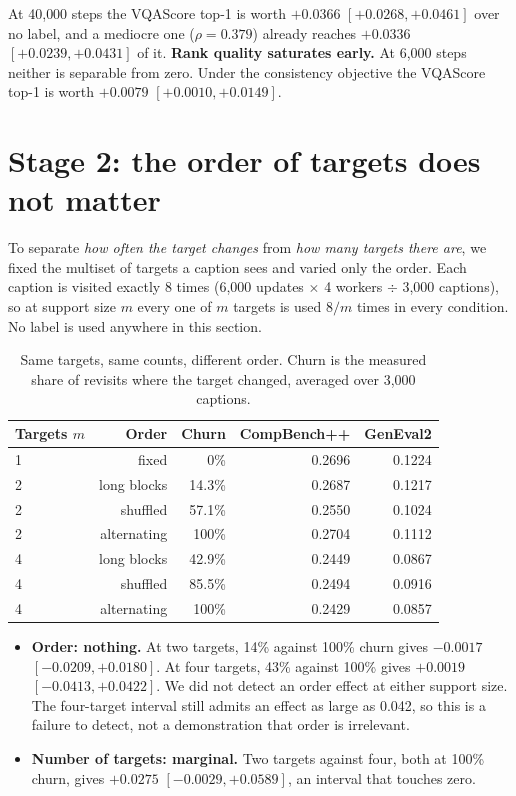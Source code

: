 \documentclass[11pt]{article}
\newcommand{\obs}[1]{\textcolor{obsblue}{#1}}
\newcommand{\bad}[1]{\textcolor{badred}{#1}}
\begin{document}
At \obs{40{,}000} steps the VQAScore top-1 is worth \obs{$+0.0366$} $[+0.0268,+0.0461]$ over no label,
and a mediocre one (\obs{$\rho=0.379$}) already reaches \obs{$+0.0336$} $[+0.0239,+0.0431]$ of it.
\textbf{Rank quality saturates early.} At \obs{6{,}000} steps neither is separable from zero. Under
the consistency objective the VQAScore top-1 is worth \obs{$+0.0079$} $[+0.0010,+0.0149]$.


\section{Stage 2: the order of targets does not matter}
\label{sec:stage2}

To separate \emph{how often the target changes} from \emph{how many targets there are}, we fixed the
multiset of targets a caption sees and varied only the order. Each caption is visited exactly
\obs{8} times (\obs{6{,}000} updates $\times$ \obs{4} workers $\div$ \obs{3{,}000} captions), so at
support size $m$ every one of $m$ targets is used $8/m$ times in every condition. No label is used
anywhere in this section.

\begin{table}[h]
\centering
\caption{Same targets, same counts, different order. Churn is the measured share of revisits where
the target changed, averaged over \obs{3{,}000} captions.}
\label{tab:order}
\small
\begin{tabular}{@{}lrrrr@{}}
\toprule
Targets $m$ & Order & Churn & CompBench++ & GenEval2 \\
\midrule
1 & fixed        & \obs{0\%}     & \obs{0.2696} & \obs{0.1224} \\
2 & long blocks  & \obs{14.3\%}  & \obs{0.2687} & \obs{0.1217} \\
2 & shuffled     & \obs{57.1\%}  & \obs{0.2550} & \obs{0.1024} \\
2 & alternating  & \obs{100\%}   & \obs{0.2704} & \obs{0.1112} \\
4 & long blocks  & \obs{42.9\%}  & \obs{0.2449} & \obs{0.0867} \\
4 & shuffled     & \obs{85.5\%}  & \obs{0.2494} & \obs{0.0916} \\
4 & alternating  & \obs{100\%}   & \obs{0.2429} & \obs{0.0857} \\
\bottomrule
\end{tabular}
\end{table}

\begin{itemize}
  \item \textbf{Order: nothing.} At two targets, \obs{14\%} against \obs{100\%} churn gives
    \bad{$-0.0017$} $[-0.0209,+0.0180]$. At four targets, \obs{43\%} against \obs{100\%} gives
    \bad{$+0.0019$} $[-0.0413,+0.0422]$. We did not detect an order effect at either support size. The four-target interval still admits an effect as large as \obs{0.042}, so this is a failure to detect, not a demonstration that order is irrelevant.
  \item \textbf{Number of targets: marginal.} Two targets against four, both at \obs{100\%} churn,
    gives \obs{$+0.0275$} $[-0.0029,+0.0589]$, an interval that touches zero.
\end{itemize}
\end{document}
